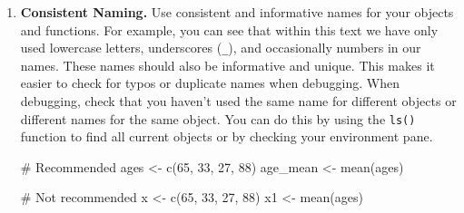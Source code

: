 \documentclass[
  letterpaper,
]{latex/krantz}
\makeatletter
\newenvironment{Shaded}{\begin{snugshade}}{\end{snugshade}}
\newcommand{\CommentTok}[1]{\textcolor[rgb]{0.37,0.37,0.37}{#1}}
\newcommand{\DecValTok}[1]{\textcolor[rgb]{0.68,0.00,0.00}{#1}}
\newcommand{\FunctionTok}[1]{\textcolor[rgb]{0.28,0.35,0.67}{#1}}
\newcommand{\NormalTok}[1]{\textcolor[rgb]{0.00,0.23,0.31}{#1}}
\newcommand{\OtherTok}[1]{\textcolor[rgb]{0.00,0.23,0.31}{#1}}
\newenvironment{kframe}{%
\medskip{}
\setlength{\fboxsep}{.8em}
 \def\at@end@of@kframe{}%
 \ifinner\ifhmode%
  \def\at@end@of@kframe{\end{minipage}}%
  \begin{minipage}{\columnwidth}%
 \fi\fi%
 \def\FrameCommand##1{\hskip\@totalleftmargin \hskip-\fboxsep
 \colorbox{shadecolor}{##1}\hskip-\fboxsep
     \hskip-\linewidth \hskip-\@totalleftmargin \hskip\columnwidth}%
 \MakeFramed {\advance\hsize-\width
   \@totalleftmargin\z@ \linewidth\hsize
   \@setminipage}}%
 {\par\unskip\endMakeFramed%
 \at@end@of@kframe}
\renewenvironment{Shaded}{\begin{kframe}}{\end{kframe}}
\makeatother
\begin{document}
\begin{enumerate}
\def\labelenumi{\arabic{enumi}.}
\item
  \textbf{Consistent Naming.} Use consistent and informative names for
  your objects and functions. For example, you can see that within this
  text we have only used lowercase letters, underscores (\texttt{\_}),
  and occasionally numbers in our names. These names should also be
  informative and unique. This makes it easier to check for typos or
  duplicate names when debugging. When debugging, check that you haven't
  used the same name for different objects or different names for the
  same object. You can do this by using the \texttt{ls()} function
   to find all current objects or
  by checking your environment pane.

\begin{Shaded}
\begin{Highlighting}[]
\CommentTok{\# Recommended}
\NormalTok{ages }\OtherTok{\textless{}{-}} \FunctionTok{c}\NormalTok{(}\DecValTok{65}\NormalTok{, }\DecValTok{33}\NormalTok{, }\DecValTok{27}\NormalTok{, }\DecValTok{88}\NormalTok{)}
\NormalTok{age\_mean }\OtherTok{\textless{}{-}} \FunctionTok{mean}\NormalTok{(ages)}

\CommentTok{\# Not recommended}
\NormalTok{x }\OtherTok{\textless{}{-}} \FunctionTok{c}\NormalTok{(}\DecValTok{65}\NormalTok{, }\DecValTok{33}\NormalTok{, }\DecValTok{27}\NormalTok{, }\DecValTok{88}\NormalTok{)}
\NormalTok{x1 }\OtherTok{\textless{}{-}} \FunctionTok{mean}\NormalTok{(ages)}
\end{Highlighting}
\end{Shaded}
\end{enumerate}

\newpage
\end{document}
